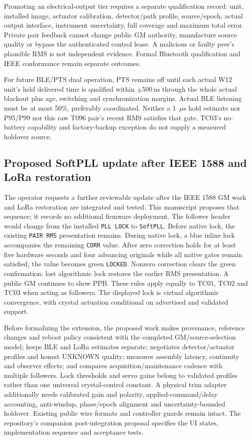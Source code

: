 \documentclass[11pt,letterpaper]{article}
\newcommand{\ns}{\,\mathrm{ns}}
\newcommand{\us}{\,\mu\mathrm{s}}
\newcommand{\code}[1]{\texttt{\small #1}}
\begin{document}
Promoting an electrical-output tier requires a separate qualification record: unit, installed image, actuator calibration, detector/path profile, source/epoch, actual output interface, instrument uncertainty, full coverage and maximum total error. Private pair feedback cannot change public GM authority, manufacture source quality or bypass the authenticated control lease. A malicious or faulty peer's plausible RMS is not independent evidence. Formal Bluetooth qualification and IEEE conformance remain separate outcomes.

For future BLE/PTS dual operation, PTS remains off until each actual W12 unit's held delivered time is qualified within $\pm500\ns$ through the whole actual blackout plus age, switching and synchronization margins. Actual BLE listening must be at most 50\%, preferably coordinated. Neither a 1 $\us$ hold estimate nor P95/P99 nor this raw T096 pair's recent RMS satisfies that gate. TC03's no-battery capability and factory-backup exception do not supply a measured holdover source.

\subsection{Proposed SoftPLL update after IEEE 1588 and LoRa restoration}
The operator requests a further reviewable update after the IEEE 1588 GM work and LoRa restoration are integrated and tested. This manuscript proposes that sequence; it records no additional firmware deployment. The follower header would change from the installed \code{PLL LOCK} to \code{SoftPLL}. Before native lock, the existing \code{PAIR RMS} presentation remains. During native lock, a blue inline lock accompanies the remaining \code{CORR} value. After zero correction holds for at least five hardware seconds and four advancing originals while all native gates remain satisfied, the value becomes green \code{LOCKED}. Nonzero correction clears the green confirmation; lost algorithmic lock restores the earlier RMS presentation. A public GM continues to show PPB. These rules apply equally to TC01, TC02 and TC03 when acting as followers. The displayed lock is virtual algorithmic convergence, with crystal actuation conditional on advertised and validated support.

Before formalizing the extension, the proposed work makes provenance, reference changes and reboot policy consistent with the completed GM/source-selection model; keeps BLE and LoRa estimates separate; negotiates detector/actuator profiles and honest UNKNOWN quality; measures assembly latency, continuity and observer effects; and compares acquisition/maintenance cadence with multiple followers. Lock thresholds and servo gains belong to validated profiles rather than one universal crystal-control constant. A physical trim adapter additionally needs calibrated gain and polarity, applied-command/delay accounting, anti-windup, phase/epoch alignment and uncertainty-bounded holdover. Existing public wire formats and controller guards remain intact. The repository's companion post-integration proposal specifies the UI states, implementation sequence and acceptance tests.
\end{document}
